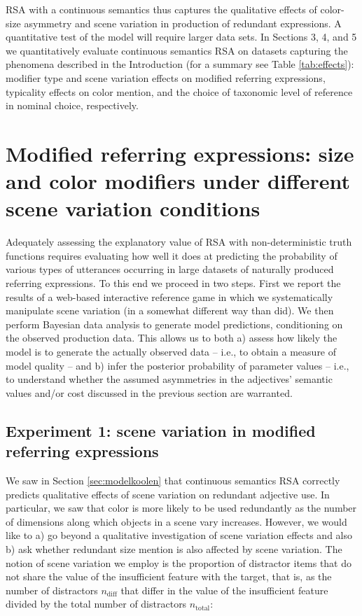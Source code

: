 \documentclass[11pt]{article}
\newcommand{\tableref}[1]{Table \ref{#1}}
\newcommand{\sectionref}[1]{Section \ref{#1}}
\begin{document}
RSA with a continuous semantics thus captures the qualitative effects of color-size asymmetry and scene variation in production of redundant expressions. A quantitative test of the model will require larger data sets. 
In Sections 3, 4, and 5 we quantitatively evaluate continuous semantics RSA on datasets capturing the phenomena described in the Introduction (for a summary see \tableref{tab:effects}): modifier type and scene variation effects on modified referring expressions, typicality effects on color mention, and the choice of taxonomic level of reference in nominal choice, respectively.

\section{Modified referring expressions: size and color modifiers under different scene variation conditions}
\label{sec:rsaevaluationbasicscene}

Adequately assessing the explanatory value of RSA with non-deterministic truth functions requires evaluating how well it does at predicting the probability of various types of utterances occurring in large datasets of naturally produced referring expressions. To this end we proceed in two steps. First we report the results of a web-based interactive reference game in which we systematically manipulate scene variation (in a somewhat different way than  did). We then perform Bayesian data analysis to generate model predictions, conditioning on the observed production data. This allows us to both a) assess  how likely the model is to generate the actually observed data -- i.e., to obtain a measure of model quality -- and b) infer the posterior probability of parameter values -- i.e., to understand whether the assumed asymmetries in the adjectives' semantic values and/or cost discussed in the previous section are warranted.


\subsection{Experiment 1: scene variation in modified referring expressions}
\label{sec:exp1-scenevar}

We saw in \sectionref{sec:modelkoolen} that continuous semantics RSA correctly predicts qualitative effects of scene variation on redundant adjective use. In particular, we saw that color is more likely to be used redundantly as the number of dimensions along which objects in a scene vary increases. However, we would like to a) go beyond a qualitative investigation of scene variation effects and also b) ask whether redundant size mention is also affected by scene variation. The notion of scene variation we employ is the proportion of distractor items that do not share the value of the insufficient feature with the target, that is, as the number of distractors $n_{\textrm{diff}}$ that differ in the value of the insufficient feature divided by the total number of distractors $n_{\textrm{total}}$:
\end{document}
